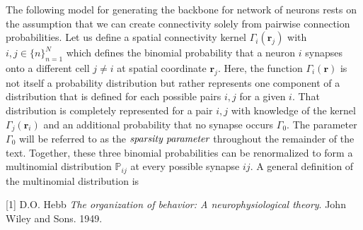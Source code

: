 \documentclass{ucetd}
\begin{document}
The following model for generating the backbone for network of neurons rests on the assumption that we can create connectivity solely from pairwise connection probabilities. Let us define a spatial connectivity kernel $\Gamma_{i}(\mathbf{r}_{j})$ with $i,j\in \{n\}_{n=1}^{N}$ which defines the binomial probability that a neuron $i$ synapses onto a different cell $j\neq i$ at spatial coordinate $\mathbf{r}_{j}$. Here, the function $\Gamma_{i}(\mathbf{r})$ is not itself a probability distribution but rather represents one component of a distribution that is defined for each possible pairs $i,j$ for a given $i$. That distribution is completely represented for a pair $i,j$ with knowledge of the kernel $\Gamma_{j}(\mathbf{r}_{i})$ and an additional probability that no synapse occurs $\Gamma_{0}$. The parameter $\Gamma_{0}$ will be referred to as the $\emph{sparsity parameter}$ throughout the remainder of the text. Together, these three binomial probabilities can be renormalized to form a multinomial distribution $\mathbb{P}_{ij}$ at every possible synapse $ij$. A general definition of the multinomial distribution is

\makebibliography

[1] D.O. Hebb \textit{The organization of behavior: A neurophysiological theory}. John Wiley and Sons. 1949.

%
%
\end{document}
